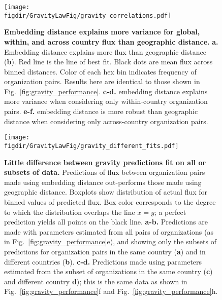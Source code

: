 \documentclass[12pt]{article} %
\def\figdir{../Figs}
\begin{document}
%
%
\begin{figure}[p!]
	\centering
	\texttt{[image: \\figdir/GravityLawFig/gravity\_correlations.pdf]}
	\caption{
		\textbf{Embedding distance explains more variance for global, within, and across country flux than geographic distance.}
		\textbf{a.}
		Embedding distance explains more flux than geographic distance (\textbf{b}).
		Red line is the line of best fit.
		Black dots are mean flux across binned distances.
		Color of each hex bin indicates frequency of organization pairs.
		Results here are identical to those shown in Fig.~\ref{fig:gravity_performance}.
		\textbf{c-d.}	embedding distance explains more variance when considering only within-country organization pairs.
		\textbf{e-f.} embedding distance is more robust than geographic distance when considering only across-country organization pairs.
	}
	\label{fig:supp:gravity_correlation}
\end{figure}



%
%
\begin{figure}[p!]
	\centering
	\texttt{[image: \\figdir/GravityLawFig/gravity\_different\_fits.pdf]}
	\caption{
		\textbf{Little difference between gravity predictions fit on all or subsets of data.}
		Predictions of flux between organization pairs made using embedding distance out-performs those made using geographic distance.
		Boxplots show distribution of actual flux for binned values of predicted flux.
		Box color corresponds to the degree to which the distribution overlaps the line $x = y$; 
		a perfect prediction yields all points on the black line.
		\textbf{a-b.} Predictions are made with parameters estimated from all pairs of organizations (as in Fig.~\ref{fig:gravity_performance}e), and showing only the subsets of predictions for organization pairs in the same country (\textbf{a}) and in different countries (\textbf{b}).
		\textbf{c-d.} Predictions made using parameters estimated from the subset of organizations in the same country (\textbf{c}) and different country \textbf{d});
		this is the same data as shown in Fig.~\ref{fig:gravity_performance}f and Fig.~\ref{fig:gravity_performance}h.
	}
	\label{fig:supp:gravity_prediction_subsets}
\end{figure}
\end{document}
